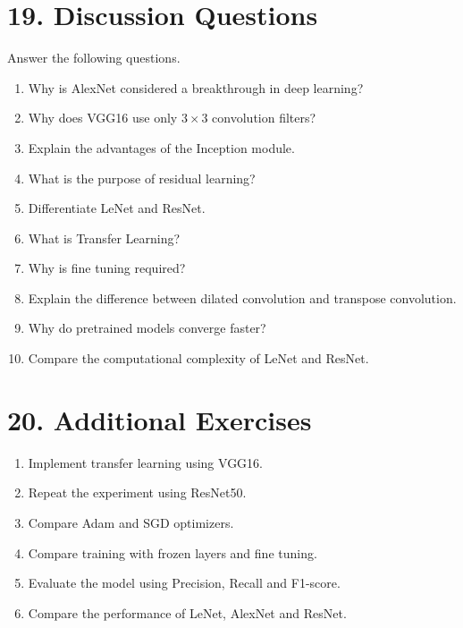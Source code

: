 \documentclass[11pt]{article}
\begin{document}

\section*{19. Discussion Questions}

Answer the following questions.

\begin{enumerate}

\item Why is AlexNet considered a breakthrough in deep learning?

\item Why does VGG16 use only $3\times3$ convolution filters?

\item Explain the advantages of the Inception module.

\item What is the purpose of residual learning?

\item Differentiate LeNet and ResNet.

\item What is Transfer Learning?

\item Why is fine tuning required?

\item Explain the difference between dilated convolution and transpose convolution.

\item Why do pretrained models converge faster?

\item Compare the computational complexity of LeNet and ResNet.

\end{enumerate}


\section*{20. Additional Exercises}

\begin{enumerate}

\item Implement transfer learning using VGG16.

\item Repeat the experiment using ResNet50.

\item Compare Adam and SGD optimizers.

\item Compare training with frozen layers and fine tuning.

\item Evaluate the model using Precision, Recall and F1-score.

\item Compare the performance of LeNet, AlexNet and ResNet.

\end{enumerate}
\end{document}
